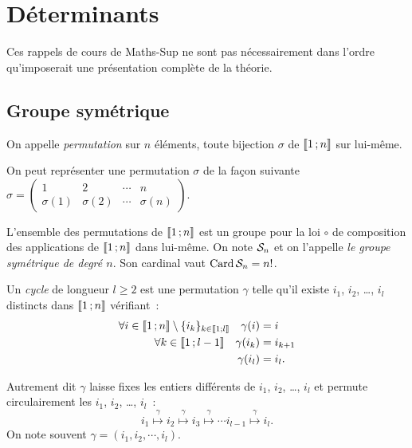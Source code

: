 \chapter{Déterminants}
\begin{remarque}
	Ces rappels de cours de Maths-Sup ne sont pas nécessairement dans l'ordre qu'imposerait une présentation complète de la théorie. 
\end{remarque}
\section{Groupe symétrique}
\begin{defdef}[permutation]
	On appelle \emph{permutation} sur $n$ éléments, toute bijection $\sigma$ de $\intervalleentier{1}{n}$ sur lui-même. 
\end{defdef}

On peut représenter une permutation $\sigma$ de la façon suivante $\sigma = 
\begin{pmatrix}
	1 & 2 & \cdots & n \\
	\sigma(1)& \sigma(2)  &\cdots  & \sigma(n) 
\end{pmatrix}
$.

L'ensemble des permutations de $\intervalleentier{1}{n}$ est un groupe pour la loi $\circ$ de composition des applications de $\intervalleentier{1}{n}$ dans lui-même. On note $\S_n$ et on l'appelle \emph{le groupe symétrique de degré $n$}. Son cardinal vaut $\Card \S_n = n!$.

\begin{defdef}[cycle]
	Un \emph{cycle} de longueur $l \geqslant 2$ est une permutation $\gamma$ telle qu'il existe $i_1$, $i_2$, \ldots, $i_l$ distincts dans $\intervalleentier{1}{n}$ vérifiant~:
	\begin{align}
		\forall i \in \intervalleentier{1}{n} \setminus \{i_k\}_{k \in \intervalleentier{1}{l}} \quad \gamma(i)&=i \\
		\forall k \in \intervalleentier{1}{l-1} \quad \gamma(i_k) &= i_{k+1} \\
		\gamma(i_l) &= i_l.
	\end{align}
\end{defdef}
Autrement dit $\gamma$ laisse fixes les entiers différents de $i_1$, $i_2$, \ldots, $i_l$ et permute circulairement les $i_1$, $i_2$, \ldots, $i_l$~:
\begin{equation}
	i_1 \overset{\gamma}{\longmapsto} i_2 \overset{\gamma}{\longmapsto} i_3 \overset{\gamma}{\longmapsto} \cdots i_{l-1} \overset{\gamma}{\longmapsto} i_l.
\end{equation}
On note souvent $\gamma = (i_1, i_2, \cdots, i_l)$.

